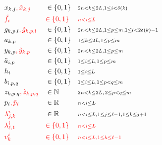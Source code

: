\documentclass[runningheads]{llncs}
\newcommand{\HL}[1]{\textcolor{red}{#1}}
\begin{document}
\begin{align*}
                 & x_{k,j}\HL{, \tilde{x}_{k,j}}                                      && \in \{0,1\}          && {\scriptstyle 2n < k \leq 2L, 1 \leq i < \delta(k)}\\
                 & \HL{\tilde{f}_i}                                                   && \HL{\in \{0,1\}}     && \HL{\scriptstyle n < i \leq L}\\
                 & g_{k,p,l}\HL{, \tilde{g}_{k,p,l}}                                  && \in \{0,1\}          && {\scriptstyle 2n < k \leq 2L, 1 \leq p \leq m, 1 \leq l<2\delta(k)-1}\\
                 & a_{k,p}                                                            && \in \{0,1\}          && {\scriptstyle 1 \leq k \leq 2L, 1 \leq p \leq m}\\
                 & y_{k,p}\HL{, \tilde{y}_{k,p}}                                      && \in \{0,1\}          && {\scriptstyle 2n < k \leq 2L, 1 \leq p \leq m}\\
                 & \tilde{a}_{i,p}                                                    && \in \{0,1\}          && {\scriptstyle 1 \leq i \leq L, 1 \leq p \leq m}\\
                 & h_{i}                                                              && \in \{0,1\}          && {\scriptstyle 1 \leq i \leq L}\\
                 & b_{i,p,q}                                                          && \in \{0,1\}          && {\scriptstyle 1 \leq i \leq L, 1 \leq p<q \leq m}\\
                 & z_{k,p,q}\HL{, \tilde{z}_{k,p,q}}                                  && \in \mathbb{N}       && {\scriptstyle 2n < k \leq 2L,\, 2 \leq p < q \leq m}\\
                 & p_{i}\HL{, \tilde{p}_i}                                            && \in \mathbb{R}       && {\scriptstyle n < i \leq L}\\
                 & \HL{\lambda^i_{j,k}}                                               && \in \mathbb{R}       && {\scriptstyle n < i \leq L, 1 \leq j \leq \ell-1, 1 \leq k \leq j+1}\\
                 & \HL{\lambda^i_{\ell,1}}                                            && \HL{\in \{0,1\}}     && \HL{\scriptstyle n < i \leq L}\\
                 & \HL{v^i_k}                                                         && \HL{\in \{0,1\}}     && \HL{\scriptstyle n < i \leq L, 1 \leq k \leq \ell-1}
\end{align*}
\endgroup
\end{document}
